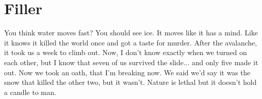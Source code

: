 \section{Filler}
You think water moves fast? You should see ice. It moves like it has a mind. Like it knows it killed the world once and got a taste for murder. After the avalanche, it took us a week to climb out. Now, I don't know exactly when we turned on each other, but I know that seven of us survived the slide... and only five made it out. Now we took an oath, that I'm breaking now. We said we'd say it was the snow that killed the other two, but it wasn't. Nature is lethal but it doesn't hold a candle to man.
